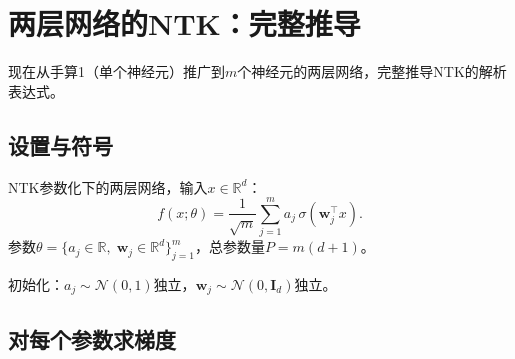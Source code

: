 \documentclass[11pt,a4paper]{article}
\newcommand{\R}{\mathbb{R}}
\newcommand{\cN}{\mathcal{N}}
\newcommand{\bI}{\mathbf{I}}
\newcommand{\bw}{\mathbf{w}}
\begin{document}
\section{两层网络的NTK：完整推导}

现在从手算1（单个神经元）推广到$m$个神经元的两层网络，完整推导NTK的解析表达式。

\subsection{设置与符号}

NTK参数化下的两层网络，输入$x\in\R^d$：
\[
f(x;\theta) = \frac{1}{\sqrt{m}}\sum_{j=1}^m a_j\,\sigma(\bw_j^\top x).
\]
参数$\theta = \{a_j\in\R,\; \bw_j\in\R^d\}_{j=1}^m$，总参数量$P = m(d+1)$。

初始化：$a_j\sim\cN(0,1)$独立，$\bw_j\sim\cN(0,\bI_d)$独立。

\subsection{对每个参数求梯度}
\end{document}
